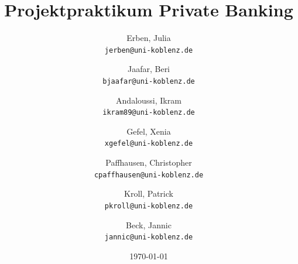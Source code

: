 \documentclass{article}\usepackage[]{graphicx}\usepackage[]{color}
\begin{document}

\parindent 0pt %
\renewcommand\refname{Literaturverzeichnis} %
\renewcommand\contentsname{Inhaltsverzeichnis} %
\renewcommand{\figurename}{Abbildung} %

\title{\Large \bf Projektpraktikum Private Banking} %

\date{\today} %

\author{ %
  Erben, Julia\\
  \texttt{jerben@uni-koblenz.de}
  \and
  Jaafar, Beri\\
  \texttt{bjaafar@uni-koblenz.de}
  \and
  Andaloussi, Ikram\\
  \texttt{ikram89@uni-koblenz.de}
  \and
  Gefel, Xenia\\
  \texttt{xgefel@uni-koblenz.de}
  \and
  Paffhausen, Christopher\\
  \texttt{cpaffhausen@uni-koblenz.de}
  \and
  Kroll, Patrick\\
  \texttt{pkroll@uni-koblenz.de}
  \and
  Beck, Jannic\\
  \texttt{jannic@uni-koblenz.de}
}

\maketitle %

\thispagestyle{empty} %

\newpage %

\thispagestyle{empty} %

\tableofcontents %

\newpage %

\end{document}
